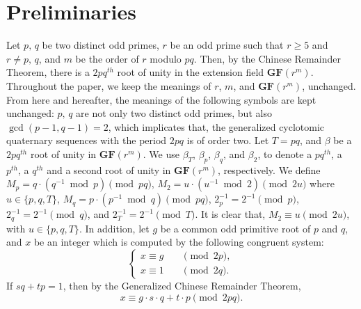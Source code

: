 \documentclass{mcom-l}
\theoremstyle{definition}
\numberwithin{equation}{section}
\begin{document}
 \section{Preliminaries}
 Let $ p,\,q $ be two distinct odd primes, $ r $ be an odd prime such that $ r \geq 5 $ and $ r \ne p,\,q $,  and $ m $ be the order of $ r $ modulo $ pq $. Then, by the Chinese Remainder Theorem, there is a $ 2pq^{th} $ root of unity in the extension field $ \mathbf{GF}(r^{m}) $. Throughout the paper, we keep the meanings of $ r $, $ m $, and $ \mathbf{GF}(r^{m}) $, unchanged. From here and hereafter, the meanings of the following symbols are kept unchanged: $ p,\,q $ are not only two distinct odd primes, but also $ \gcd(p-1,q-1)=2 $, which implicates that, the generalized cyclotomic quaternary sequences with the period $ 2pq $ is of order two. Let $ T=pq $, and $ \beta $ be a $ 2pq^{th} $ root of unity in $ \mathbf{GF}(r^{m}) $. We use $ \beta_{T} $, $ \beta_{p} $, $ \beta_{q} $, and $ \beta_{2} $, to denote a $ pq^{th} $, a $ p^{th} $, a $ q^{th} $ and a second root of unity in $ \mathbf{GF}(r^{m}) $, respectively. We define $ M_{p}=q\cdot(q^{-1}\bmod{p}) \pmod{pq}$, $ M_{2}=u\cdot(u^{-1}\bmod 2) \pmod {2u}$ where $ u\in \lbrace p,q,T\rbrace $, $ M_{q}=p\cdot(p^{-1}\bmod{q}) \pmod{pq}$, $ 2^{-1}_{p} =2^{-1}\pmod p$, $ 2^{-1}_{q} =2^{-1}\pmod q$, and $ 2^{-1}_{T} =2^{-1}\pmod T$. It is clear that, $ M_{2}\equiv u \pmod{2u} $, with $ u\in \lbrace p,q,T\rbrace $. In addition, let $ g $ be a common odd primitive root of $ p $ and $ q $, and $ x $ be an integer which is computed by the following congruent system:
 \begin{equation}\label{sec2_eq_x1}
 \begin{cases}
 x\equiv g\quad &\pmod{2p},\\
 x\equiv 1\quad &\pmod{2q}.
 \end{cases}
 \end{equation}
 If $ sq+tp=1 $, then by the Generalized Chinese Remainder Theorem, 
 \begin{equation}\label{sec2_eq_x2}
 x\equiv g\cdot s\cdot q+t\cdot p\pmod{2pq}.
 \end{equation}
 
\end{document}

